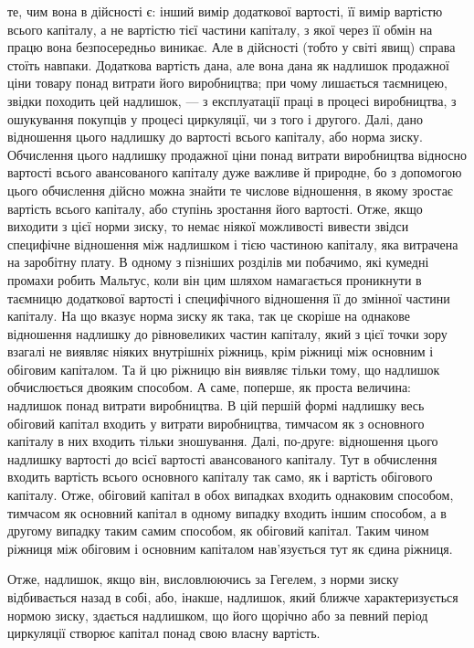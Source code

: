 \parcont{}  %
те, чим вона в дійсності є: інший вимір додаткової вартості,
її вимір вартістю всього капіталу, а не вартістю тієї частини
капіталу, з якої через її обмін на працю вона безпосередньо
виникає. Але в дійсності (тобто у світі явищ) справа стоїть навпаки.
Додаткова вартість дана, але вона дана як надлишок продажної
ціни товару понад витрати його виробництва; при чому
лишається таємницею, звідки походить цей надлишок, — з експлуатації
праці в процесі виробництва, з ошукування покупців
у процесі циркуляції, чи з того і другого. Далі, дано відношення
цього надлишку до вартості всього капіталу, або
норма зиску. Обчислення цього надлишку продажної ціни понад
витрати виробництва відносно вартості всього авансованого капіталу
дуже важливе й природне, бо з допомогою цього обчислення
дійсно можна знайти те числове відношення, в якому
зростає вартість всього капіталу, або ступінь зростання його
вартості. Отже, якщо виходити з цієї норми зиску, то немає
ніякої можливості вивести звідси специфічне відношення між
надлишком і тією частиною капіталу, яка витрачена на заробітну
плату. В одному з пізніших розділів ми побачимо, які кумедні
промахи робить Мальтус, коли він цим шляхом намагається
проникнути в таємницю додаткової вартості і специфічного відношення
її до змінної частини капіталу. На що вказує норма
зиску як така, так це скоріше на однакове відношення надлишку
до рівновеликих частин капіталу, який з цієї точки зору взагалі
не виявляє ніяких внутрішніх ріжниць, крім ріжниці між основним
і обіговим капіталом. Та й цю ріжницю він виявляє тільки
тому, що надлишок обчислюється двояким способом. А саме,
поперше, як проста величина: надлишок понад витрати виробництва.
В цій першій формі надлишку весь обіговий капітал входить
у витрати виробництва, тимчасом як з основного капіталу
в них входить тільки зношування. Далі, по-друге: відношення
цього надлишку вартості до всієї вартості авансованого капіталу.
Тут в обчислення входить вартість всього основного капіталу
так само, як і вартість обігового капіталу. Отже, обіговий
капітал в обох випадках входить однаковим способом, тимчасом
як основний капітал в одному випадку входить іншим
способом, а в другому випадку таким самим способом, як обіговий
капітал. Таким чином ріжниця між обіговим і основним капіталом
нав’язується тут як єдина ріжниця.

Отже, надлишок, якщо він, висловлюючись за Гегелем, з норми
зиску відбивається назад в собі, або, інакше, надлишок, який
ближче характеризується нормою зиску, здається надлишком,
що його щорічно або за певний період циркуляції створює капітал
понад свою власну вартість.

